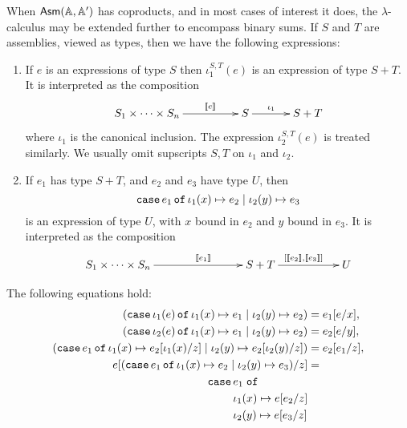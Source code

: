 When $\mathsf{Asm}(\mathbb{A},\mathbb{A}')$ has coproducts, and in most cases of interest it does,
the $\lambda$-calculus may be extended further to encompass binary
sums. If $S$ and $T$ are assemblies, viewed as types, then
we have the following expressions:
%
\begin{enumerate}
\item If $e$ is an expressions of type $S$ then
  $\iota_1^{S,T}(e)$ is an expression of type $S +
  T$. It is interpreted as the composition
  \begin{equation*}
    \xymatrix{
      **[l]{S_1 \times \cdots \times S_n}
      \ar[r]^{\sem{e}}
      &
      {S}
      \ar[r]^{\iota_1}
      &
     **[r]{S + T}
    }
  \end{equation*}
  where $\iota_1$ is the canonical inclusion. The expression
  $\iota_2^{S,T}(e)$ is treated similarly. We usually omit
  supscripts $S, T$ on $\iota_1$ and $\iota_2$.
\item If $e_1$ has type $S + T$, and $e_2$ and $e_3$ have
  type $U$, then
  \begin{equation*}
    \mathtt{case}\,e_1\,\mathtt{of}\,\iota_1(x) \mapsto e_2 \mid \iota_2(y) \mapsto e_3
  \end{equation*}
  is an expression of type $U$, with $x$ bound in $e_2$ and
  $y$ bound in $e_3$. It is interpreted as the composition
  \begin{equation*}
    \xymatrix@+3em{
      **[l]{S_1 \times \cdots \times S_n}
      \ar[r]^{\sem{e_1}}
      &
      {S + T}
      \ar[r]^{[\sem{e_2}, \sem{e_3}]}
      &
      {U}
    }
  \end{equation*}
\end{enumerate}
%
The following equations hold:
%
\begin{align*}
  (\mathtt{case}\,\iota_1(e)\,\mathtt{of}\,\iota_1(x) \mapsto e_1 \mid \iota_2(y) \mapsto e_2) &=
  e_1[e/x], \\
  (\mathtt{case}\,\iota_2(e)\,\mathtt{of}\,\iota_1(x) \mapsto e_1 \mid \iota_2(y) \mapsto e_2) &=
  e_2[e/y], \\
  (\mathtt{case}\,e_1\,\mathtt{of}\,\iota_1(x) \mapsto e_2[\iota_1(x)/z] \mid \iota_2(y) \mapsto e_2[\iota_2(y)/z]
  ) &= e_2[e_1/z], \\
  e[(\mathtt{case}\,e_1\,\mathtt{of}\,\iota_1(x) \mapsto e_2 \mid \iota_2(y) \mapsto e_3)/z] &= \\
  \qquad
  \begin{aligned}[t]\mathtt{case}\,&e_1\;\mathtt{of}\\&\iota_1(x) \mapsto e[e_2/z] \\&\iota_2(y) \mapsto e[e_3/z]\end{aligned}
\end{align*}

